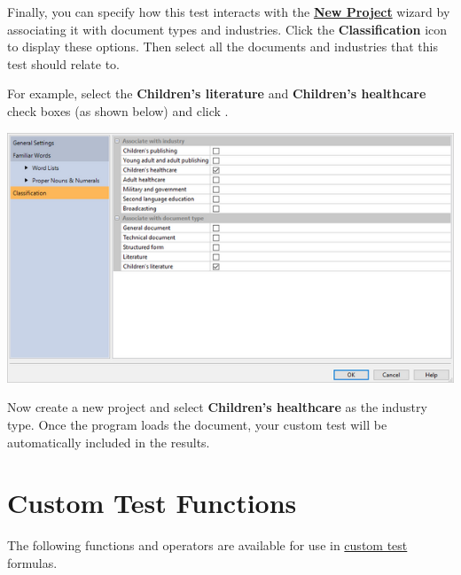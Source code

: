 \documentclass[
]{book}
\theoremstyle{definition}
\theoremstyle{definition}
\theoremstyle{definition}
\theoremstyle{definition}
\theoremstyle{remark}
\begin{document}
Finally, you can specify how this test interacts with the \protect\hyperlink{creating-standard-project}{\textbf{New Project}} wizard by associating it with document types and industries. Click the \textbf{Classification} icon to display these options. Then select all the documents and industries that this test should relate to.

For example, select the \textbf{Children's literature} and \textbf{Children's healthcare} check boxes (as shown below) and click .

\includegraphics{Images/CustomTestWizardSettings.png}

Now create a new project and select \textbf{Children's healthcare} as the industry type. Once the program loads the document, your custom test will be automatically included in the results.

\hypertarget{custom-test-functions}{%
\section{Custom Test Functions}\label{custom-test-functions}}

The following functions and operators are available for use in \protect\hyperlink{creating-custom-test}{custom test} formulas.
\end{document}
